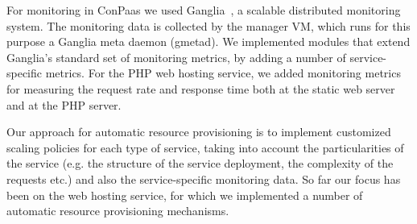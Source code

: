 
For monitoring in ConPaas we used Ganglia~\cite{ganglia}, a scalable 
distributed monitoring system. The monitoring data is collected by
the manager VM, which runs for this purpose a Ganglia meta daemon
(gmetad). We implemented modules that extend Ganglia's standard
set of monitoring metrics, by adding a number of service-specific
metrics. For the PHP web hosting service, we added monitoring metrics
for measuring the request rate and response time both at the static web
server and at the PHP server.


Our approach for automatic resource provisioning is to implement
customized scaling policies for each type of service, taking
into account the particularities of the service (e.g. the structure
of the service deployment, the complexity of the requests etc.)
and also the service-specific monitoring data. So far our focus 
has been on the web hosting service, for which we implemented a number of
automatic resource provisioning mechanisms.

